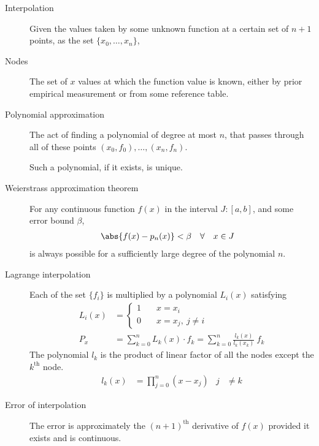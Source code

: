 \begin{description}
    \item[Interpolation] Given the values taken by some unknown function at a certain
        set of $ n+1 $ points, as the set $ \{x_0,\dots,x_n\} $,


    \item[Nodes] The set of $ x $ values at which the function value is known, either
        by prior empirical measurement or from some reference table.

    \item[Polynomial approximation] The act of finding a polynomial of degree at most
        $ n $, that passes through all of these points $ (x_0, f_0), \dots, (x_n, f_n) $.
        \par
        Such a polynomial, if it exists, is unique.

    \item[Weierstrass approximation theorem] For any continuous function $ f(x) $ in the
        interval $ J:[a,b] $, and some error bound $ \beta $,
        \begin{align}
            \abs{f(x) - p_n(x)} & < \beta & \forall \quad x & \in J
        \end{align}
        is always possible for a sufficiently large degree of the polynomial $ n $.

    \item[Lagrange interpolation] Each of the set $ \{f_i\} $ is multiplied by a
        polynomial $ L_i(x) $ satisfying
        \begin{align}
            L_i(x) & = \begin{cases}
                           1 & \quad x = x_i            \\
                           0 & \quad x = x_j,\ j \neq i
                       \end{cases}                      \\
            P_x    & = \sum_{k=0}^{n} L_k(x) \cdot f_k  = \sum_{k=0}^{n}
            \frac{l_k(x)}{l_k(x_k)}\ f_k
        \end{align}
        The polynomial $ l_k $ is the product of linear factor of all the nodes except
        the $ k^{\text{th}} $ node.
        \begin{align}
            l_k(x) & = \prod_{j=0}^{n} (x - x_j) & j & \neq k
        \end{align}

    \item[Error of interpolation] The error is approximately the $ (n+1)^{\text{th}} $
        derivative of $ f(x) $ provided it exists and is continuous.


\end{description}
